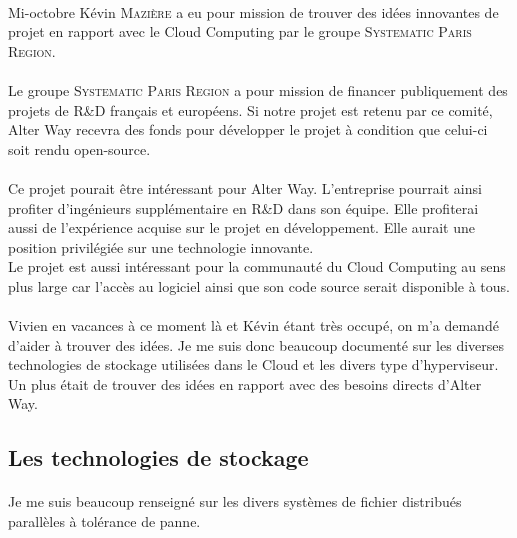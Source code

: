 \paragraph*{}
Mi-octobre Kévin \textsc{Mazière} a eu pour mission de trouver des idées innovantes de projet en rapport avec le Cloud Computing par le groupe \textsc{Systematic Paris Region}.

\paragraph*{}
Le groupe \textsc{Systematic Paris Region} a pour mission de financer publiquement des projets de R\&D français et européens. Si notre projet est retenu par ce comité, Alter Way
recevra des fonds pour développer le projet à condition que celui-ci soit rendu open-source.

\paragraph*{}
Ce projet pourait être intéressant pour Alter Way. L'entreprise pourrait ainsi profiter d'ingénieurs supplémentaire en R\&D dans son équipe.
Elle profiterai aussi de l'expérience acquise sur le projet en développement. Elle aurait une position privilégiée sur une technologie innovante.\\
Le projet est aussi intéressant pour la communauté du Cloud Computing au sens plus large car l'accès au logiciel ainsi que son code source serait disponible à tous.


\paragraph*{}
Vivien en vacances à ce moment là et Kévin étant très occupé, on m'a demandé d'aider à trouver des idées.
Je me suis donc beaucoup documenté sur les diverses technologies de stockage utilisées dans le Cloud et les divers type d'hyperviseur.
\\
Un plus était de trouver des idées en rapport avec des besoins directs d'Alter Way.


\subsection{Les technologies de stockage}
\label{fsdpft}
\paragraph*{}
Je me suis beaucoup renseigné sur les divers systèmes de fichier distribués parallèles à tolérance de panne.

